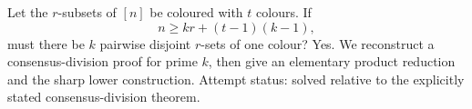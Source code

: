 Let the \(r\)-subsets of \([n]\) be coloured with \(t\) colours. If
\[
n\geq kr+(t-1)(k-1),
\]
must there be \(k\) pairwise disjoint \(r\)-sets of one colour?
Yes. We reconstruct a consensus-division proof for prime \(k\), then give an elementary product reduction and the sharp lower construction. Attempt status: solved relative to the explicitly stated consensus-division theorem.
